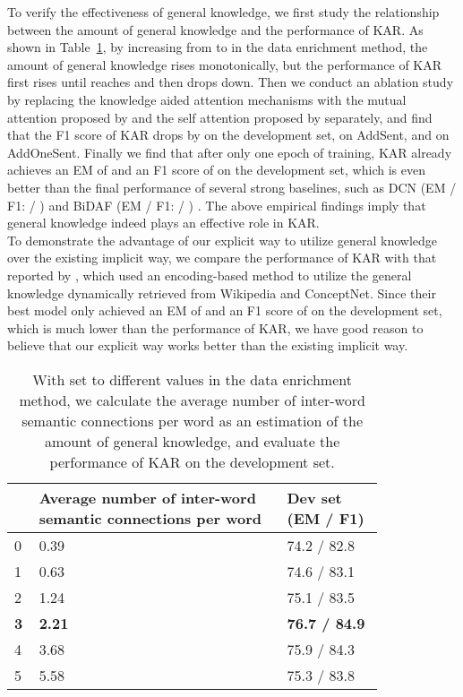 \documentclass[11pt,a4paper]{article}
\begin{document}
To verify the effectiveness of general knowledge, we first study the relationship between the amount of general knowledge and the performance of KAR. As shown in Table~\ref{t3}, by increasing  from  to  in the data enrichment method, the amount of general knowledge rises monotonically, but the performance of KAR first rises until  reaches  and then drops down. Then we conduct an ablation study by replacing the knowledge aided attention mechanisms with the mutual attention proposed by \citet{seominjoon:2016} and the self attention proposed by \citet{wangwenhui:2017} separately, and find that the F1 score of KAR drops by  on the development set,  on AddSent, and  on AddOneSent. Finally we find that after only one epoch of training, KAR already achieves an EM of  and an F1 score of  on the development set, which is even better than the final performance of several strong baselines, such as DCN (EM / F1:  / ) \cite{xiongcaiming:2016} and BiDAF (EM / F1:  / ) \cite{seominjoon:2016}. The above empirical findings imply that general knowledge indeed plays an effective role in KAR. \\
To demonstrate the advantage of our explicit way to utilize general knowledge over the existing implicit way, we compare the performance of KAR with that reported by \citet{weissenborndirk:2017}, which used an encoding-based method to utilize the general knowledge dynamically retrieved from Wikipedia and ConceptNet. Since their best model only achieved an EM of  and an F1 score of  on the development set, which is much lower than the performance of KAR, we have good reason to believe that our explicit way works better than the existing implicit way.
\begin{table}
\centering
\begin{tabular}
{|m{0.03\linewidth}|m{0.57\linewidth}|m{0.22\linewidth}|}
\hline
\boldmath{} &
\textbf{Average number of inter-word semantic connections per word} &
\textbf{Dev set \newline (EM / F1)} \\
\hline
0 & 0.39 & 74.2 / 82.8 \\
\hline
1 & 0.63 & 74.6 / 83.1 \\
\hline
2 & 1.24 & 75.1 / 83.5 \\
\hline
\textbf{3} & \textbf{2.21} & \textbf{76.7 / 84.9} \\
\hline
4 & 3.68 & 75.9 / 84.3 \\
\hline
5 & 5.58 & 75.3 / 83.8 \\
\hline
\end{tabular}
\caption{\label{t3} With  set to different values in the data enrichment method, we calculate the average number of inter-word semantic connections per word as an estimation of the amount of general knowledge, and evaluate the performance of KAR on the development set.}
\end{table}
\end{document}
